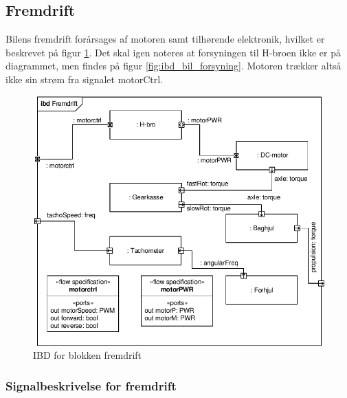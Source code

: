 \subsection{Fremdrift}

Bilens fremdrift forårsages af motoren samt tilhørende elektronik, hvilket er beskrevet på figur \ref{fig:ibd_fremdrift}. Det skal igen noteres at forsyningen til H-broen ikke er på diagrammet, men findes på figur \ref{fig:ibd_bil_forsyning}. Motoren trækker altså ikke sin strøm fra signalet motorCtrl. 

\begin{figure}[h]
\centering
\includegraphics[scale=1]{../fig/diagrammer/bil/ibd_fremdrift.pdf}
\caption{IBD for blokken fremdrift}
\label{fig:ibd_fremdrift}
\end{figure}

\clearpage

\subsubsection{Signalbeskrivelse for fremdrift}

